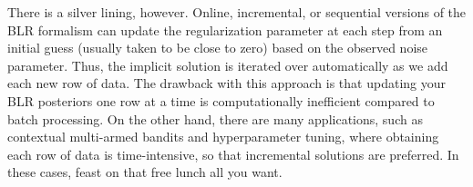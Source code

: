 \documentclass{article}
\begin{document}
There is a silver lining, however. Online, incremental, or sequential versions of the BLR formalism can update the regularization parameter at each step from an initial guess (usually taken to be close to zero) based on the observed noise parameter. Thus, the implicit solution is iterated over automatically as we add each new row of data. The drawback with this approach is that updating your BLR posteriors one row at a time is computationally inefficient compared to batch processing. On the other hand, there are many applications, such as contextual multi-armed bandits and hyperparameter tuning, where obtaining each row of data is time-intensive, so that incremental solutions are preferred. In these cases, feast on that free lunch all you want.

\printbibliography
\end{document}
